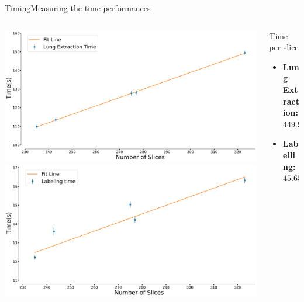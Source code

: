 \documentclass{standalone}
\begin{document}
	\begin{frame}[noframenumbering]{Timing}{Measuring the time performances}
		\begin{columns}
			\begin{column}{.6\textwidth}
				\centering\includegraphics[width=.9\linewidth]{./img/Lung_timing}
				\centering\includegraphics[width=.9\linewidth]{./img/Labels_timing}
			\end{column}
			\begin{column}{.3\textwidth}
				\begin{block}{Time per slice}
					\begin{itemize}
						\item \scriptsize\textbf{Lung Extraction:}$449.94\pm 0.03\,ms$
						\item \scriptsize\textbf{Labelling:}$45.65\pm 0.05\,ms$
					\end{itemize}
				\end{block}
			\end{column}
		\end{columns}
	\end{frame}
\end{document}
